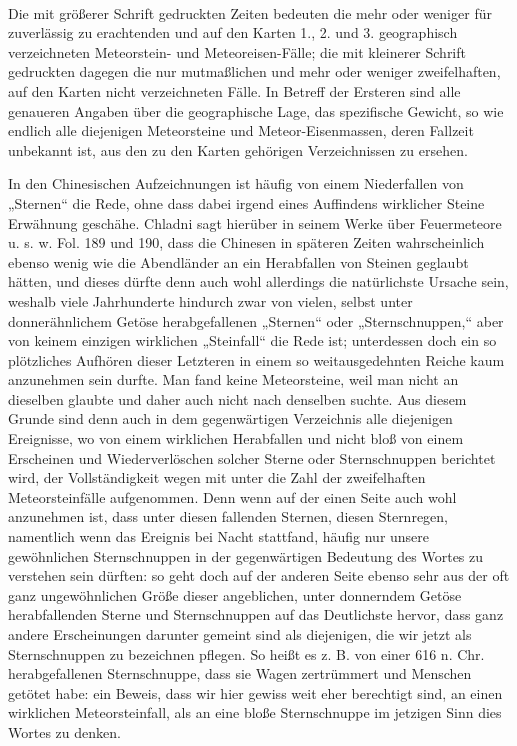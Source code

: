\documentclass[a4paper, 11pt, oneside, polutonikogreek, german]{article}
\begin{document}
\paragraph{}
Die mit größerer Schrift gedruckten Zeiten bedeuten die mehr oder weniger für zuverlässig zu erachtenden und auf den Karten 1., 2. und 3. geographisch verzeichneten Meteorstein- und Meteoreisen-Fälle; die mit kleinerer Schrift gedruckten dagegen die nur mutmaßlichen und mehr oder weniger zweifelhaften, auf den Karten nicht verzeichneten Fälle. In Betreff der Ersteren sind alle genaueren Angaben über die geographische Lage, das spezifische Gewicht, so wie endlich alle diejenigen Meteorsteine und Meteor-Eisenmassen, deren Fallzeit unbekannt ist, aus den zu den Karten gehörigen Verzeichnissen zu ersehen.

In den Chinesischen Aufzeichnungen ist häufig von einem Niederfallen von „Sternen“ die Rede, ohne dass dabei irgend eines Auffindens wirklicher Steine Erwähnung geschähe. Chladni sagt hierüber in seinem Werke über Feuermeteore u. s. w. Fol. 189 und 190, dass die Chinesen in späteren Zeiten wahrscheinlich ebenso wenig wie die Abendländer an ein Herabfallen von Steinen geglaubt hätten, und dieses dürfte denn auch wohl allerdings die natürlichste Ursache sein, weshalb viele Jahrhunderte hindurch zwar von vielen, selbst unter donnerähnlichem Getöse herabgefallenen „Sternen“ oder „Sternschnuppen,“ aber von keinem einzigen wirklichen „Steinfall“ die Rede ist; unterdessen doch ein so plötzliches Aufhören dieser Letzteren in einem so weitausgedehnten Reiche kaum anzunehmen sein durfte. Man fand keine Meteorsteine, weil man nicht an dieselben glaubte und daher auch nicht nach denselben suchte. Aus diesem Grunde sind denn auch in dem gegenwärtigen Verzeichnis alle diejenigen Ereignisse, wo von einem wirklichen Herabfallen und nicht bloß von einem Erscheinen und Wiederverlöschen solcher Sterne oder Sternschnuppen berichtet wird, der Vollständigkeit wegen mit unter die Zahl der zweifelhaften Meteorsteinfälle aufgenommen. Denn wenn auf der einen Seite auch wohl anzunehmen ist, dass unter diesen fallenden Sternen, diesen Sternregen, namentlich wenn das Ereignis bei Nacht stattfand, häufig nur unsere gewöhnlichen Sternschnuppen in der gegenwärtigen Bedeutung des Wortes zu verstehen sein dürften: so geht doch auf der anderen Seite ebenso sehr aus der oft ganz ungewöhnlichen Größe dieser angeblichen, unter donnerndem Getöse herabfallenden Sterne und Sternschnuppen auf das Deutlichste hervor, dass ganz andere Erscheinungen darunter gemeint sind als diejenigen, die wir jetzt als Sternschnuppen zu bezeichnen pflegen. So heißt es z. B. von einer 616 n. Chr. herabgefallenen Sternschnuppe, dass sie Wagen zertrümmert und Menschen getötet habe: ein Beweis, dass wir hier gewiss weit eher berechtigt sind, an einen wirklichen Meteorsteinfall, als an eine bloße Sternschnuppe im jetzigen Sinn dies Wortes zu denken.
\end{document}
